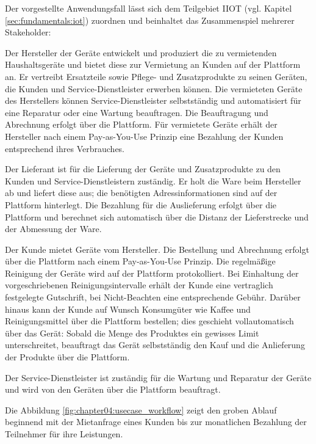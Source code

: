 Der vorgestellte Anwendungsfall lässt sich dem Teilgebiet \ac{IIOT} (vgl. Kapitel \ref{sec:fundamentals:iot}) zuordnen und beinhaltet das Zusammenspiel mehrerer Stakeholder:
\begin{description}
\label{description:chapter04:stakeholder}
  \item[Hersteller] Der Hersteller der Geräte entwickelt und produziert die zu vermietenden Haushaltsgeräte und bietet diese zur Vermietung an Kunden auf der Plattform an. Er vertreibt Ersatzteile sowie Pflege- und Zusatzprodukte zu seinen Geräten, die Kunden und Service-Dienstleister erwerben können. Die vermieteten Geräte des Herstellers können Service-Dienstleister selbstständig und automatisiert für eine Reparatur oder eine Wartung beauftragen. Die Beauftragung und Abrechnung erfolgt über die Plattform. Für vermietete Geräte erhält der Hersteller nach einem Pay-as-You-Use Prinzip eine Bezahlung der Kunden entsprechend ihres Verbrauches.
  \item[Lieferant] Der Lieferant ist für die Lieferung der Geräte und Zusatzprodukte zu den Kunden und Service-Dienstleistern zuständig. Er holt die Ware beim Hersteller ab und liefert diese aus; die benötigten Adressinformationen sind auf der Plattform hinterlegt. Die Bezahlung für die Auslieferung erfolgt über die Plattform und berechnet sich automatisch über die Distanz der Lieferstrecke und der Abmessung der Ware.
  \item[Kunde] Der Kunde mietet Geräte vom Hersteller. Die Bestellung und Abrechnung erfolgt über die Plattform nach einem Pay-as-You-Use Prinzip. Die regelmäßige Reinigung der Geräte wird auf der Plattform protokolliert. Bei Einhaltung der vorgeschriebenen Reinigungsintervalle erhält der Kunde eine vertraglich festgelegte Gutschrift, bei Nicht-Beachten eine entsprechende Gebühr.  Darüber hinaus kann der Kunde auf Wunsch Konsumgüter wie Kaffee und Reinigungsmittel über die Plattform bestellen; dies geschieht vollautomatisch über das Gerät: Sobald die Menge des Produktes ein gewisses Limit unterschreitet, beauftragt das Gerät selbstständig den Kauf und die Anlieferung der Produkte über die Plattform.
  \item[Service-Dienstleister] Der Service-Dienstleister ist zuständig für die Wartung und Reparatur der Geräte und wird von den Geräten über die Plattform beauftragt.
\end{description}

Die Abbildung \ref{fig:chapter04:usecase_workflow} zeigt den groben Ablauf beginnend mit der Mietanfrage eines Kunden bis zur monatlichen Bezahlung der Teilnehmer für ihre Leistungen.

